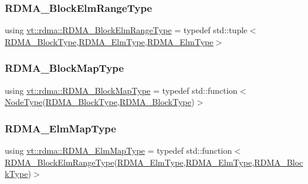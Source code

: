 \subsubsection{\texorpdfstring{R\+D\+M\+A\+\_\+\+Block\+Elm\+Range\+Type}{RDMA\_BlockElmRangeType}}
{\footnotesize\ttfamily using \hyperlink{namespacevt_1_1rdma_a8320f97b4a2866df60d9778486dbcd0f}{vt\+::rdma\+::\+R\+D\+M\+A\+\_\+\+Block\+Elm\+Range\+Type} = typedef std\+::tuple$<$\hyperlink{namespacevt_ae54d2ca8f6bb4d65faf65118c82cd6f7}{R\+D\+M\+A\+\_\+\+Block\+Type},\hyperlink{namespacevt_a2c2a902092b72056f70210c159f966f0}{R\+D\+M\+A\+\_\+\+Elm\+Type},\hyperlink{namespacevt_a2c2a902092b72056f70210c159f966f0}{R\+D\+M\+A\+\_\+\+Elm\+Type}$>$}

\mbox{\label{namespacevt_1_1rdma_a049e294a5236ad30692253d5f82886c9}} 
\subsubsection{\texorpdfstring{R\+D\+M\+A\+\_\+\+Block\+Map\+Type}{RDMA\_BlockMapType}}
{\footnotesize\ttfamily using \hyperlink{namespacevt_1_1rdma_a049e294a5236ad30692253d5f82886c9}{vt\+::rdma\+::\+R\+D\+M\+A\+\_\+\+Block\+Map\+Type} = typedef std\+::function$<$\hyperlink{namespacevt_a866da9d0efc19c0a1ce79e9e492f47e2}{Node\+Type}(\hyperlink{namespacevt_ae54d2ca8f6bb4d65faf65118c82cd6f7}{R\+D\+M\+A\+\_\+\+Block\+Type},\hyperlink{namespacevt_ae54d2ca8f6bb4d65faf65118c82cd6f7}{R\+D\+M\+A\+\_\+\+Block\+Type})$>$}

\mbox{\label{namespacevt_1_1rdma_a6798ab36a5dcb8749c25dff719f9ce07}} 
\subsubsection{\texorpdfstring{R\+D\+M\+A\+\_\+\+Elm\+Map\+Type}{RDMA\_ElmMapType}}
{\footnotesize\ttfamily using \hyperlink{namespacevt_1_1rdma_a6798ab36a5dcb8749c25dff719f9ce07}{vt\+::rdma\+::\+R\+D\+M\+A\+\_\+\+Elm\+Map\+Type} = typedef std\+::function$<$\hyperlink{namespacevt_1_1rdma_a8320f97b4a2866df60d9778486dbcd0f}{R\+D\+M\+A\+\_\+\+Block\+Elm\+Range\+Type}(\hyperlink{namespacevt_a2c2a902092b72056f70210c159f966f0}{R\+D\+M\+A\+\_\+\+Elm\+Type},\hyperlink{namespacevt_a2c2a902092b72056f70210c159f966f0}{R\+D\+M\+A\+\_\+\+Elm\+Type},\hyperlink{namespacevt_ae54d2ca8f6bb4d65faf65118c82cd6f7}{R\+D\+M\+A\+\_\+\+Block\+Type})$>$}

